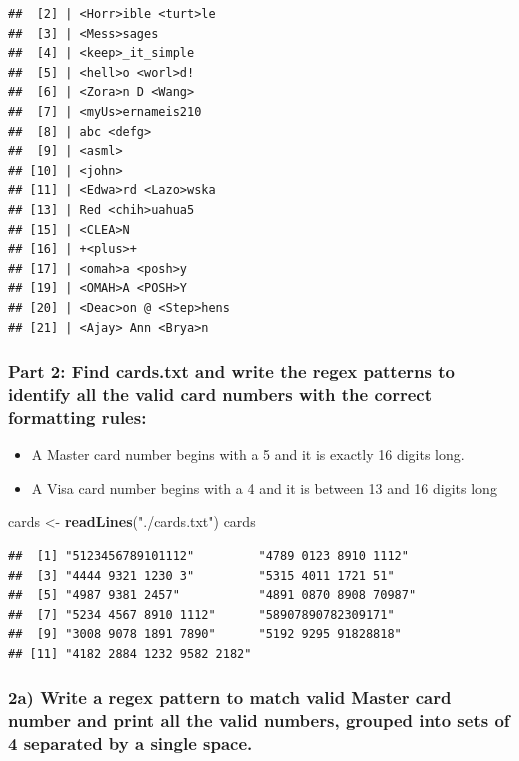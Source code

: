 \documentclass[
]{article}
\newenvironment{Shaded}{\begin{snugshade}}{\end{snugshade}}
\newcommand{\FunctionTok}[1]{\textcolor[rgb]{0.13,0.29,0.53}{\textbf{#1}}}
\newcommand{\NormalTok}[1]{#1}
\newcommand{\OtherTok}[1]{\textcolor[rgb]{0.56,0.35,0.01}{#1}}
\newcommand{\StringTok}[1]{\textcolor[rgb]{0.31,0.60,0.02}{#1}}
\providecommand{\tightlist}{%
  \setlength{\itemsep}{0pt}\setlength{\parskip}{0pt}}
\begin{document}
\begin{verbatim}
##  [2] | <Horr>ible <turt>le
##  [3] | <Mess>sages
##  [4] | <keep>_it_simple
##  [5] | <hell>o <worl>d!
##  [6] | <Zora>n D <Wang>
##  [7] | <myUs>ernameis210
##  [8] | abc <defg>
##  [9] | <asml>
## [10] | <john>
## [11] | <Edwa>rd <Lazo>wska
## [13] | Red <chih>uahua5
## [15] | <CLEA>N
## [16] | +<plus>+
## [17] | <omah>a <posh>y
## [19] | <OMAH>A <POSH>Y
## [20] | <Deac>on @ <Step>hens
## [21] | <Ajay> Ann <Brya>n
\end{verbatim}

\subsubsection{Part 2: Find cards.txt and write the regex patterns to
identify all the valid card numbers with the correct formatting
rules:}\label{part-2-find-cards.txt-and-write-the-regex-patterns-to-identify-all-the-valid-card-numbers-with-the-correct-formatting-rules}

\begin{itemize}
\tightlist
\item
  A Master card number begins with a 5 and it is exactly 16 digits long.
\item
  A Visa card number begins with a 4 and it is between 13 and 16 digits
  long
\end{itemize}

\begin{Shaded}
\begin{Highlighting}[]
\NormalTok{cards }\OtherTok{\textless{}{-}} \FunctionTok{readLines}\NormalTok{(}\StringTok{"./cards.txt"}\NormalTok{)}
\NormalTok{cards}
\end{Highlighting}
\end{Shaded}

\begin{verbatim}
##  [1] "5123456789101112"         "4789 0123 8910 1112"     
##  [3] "4444 9321 1230 3"         "5315 4011 1721 51"       
##  [5] "4987 9381 2457"           "4891 0870 8908 70987"    
##  [7] "5234 4567 8910 1112"      "58907890782309171"       
##  [9] "3008 9078 1891 7890"      "5192 9295 91828818"      
## [11] "4182 2884 1232 9582 2182"
\end{verbatim}

\subsubsection{2a) Write a regex pattern to match valid Master card
number and print all the valid numbers, grouped into sets of 4 separated
by a single
space.}\label{a-write-a-regex-pattern-to-match-valid-master-card-number-and-print-all-the-valid-numbers-grouped-into-sets-of-4-separated-by-a-single-space.}
\end{document}
